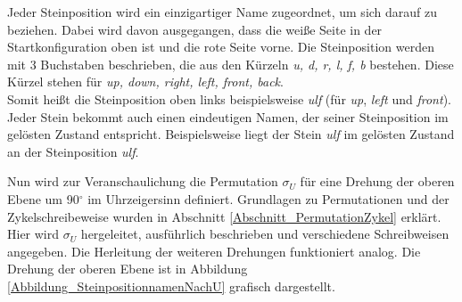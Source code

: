 \documentclass[12pt,a4paper, usenames, dvipsnames]{article}
\theoremstyle{mystyle}
\theoremstyle{definition}
\begin{document}
Jeder Steinposition wird ein einzigartiger Name zugeordnet, um sich darauf zu beziehen. Dabei wird davon ausgegangen, dass die weiße Seite in der Startkonfiguration oben ist und die rote Seite vorne. Die Steinposition werden mit 3 Buchstaben beschrieben, die aus den Kürzeln \textit{u, d, r, l, f, b} bestehen. Diese Kürzel stehen für \textit{up, down, right, left, front, back}. \\
Somit heißt die Steinposition oben links beispielsweise \textit{ulf} (für \textit{up}, \textit{left} und \textit{front}). 
Jeder Stein bekommt auch einen eindeutigen Namen, der seiner Steinposition im gelösten Zustand entspricht. Beispielsweise liegt der Stein \textit{ulf} im gelösten Zustand an der Steinposition \textit{ulf}.

Nun wird zur Veranschaulichung die Permutation $\sigma_U$ für eine Drehung der oberen Ebene um 90$^\circ$ im Uhrzeigersinn definiert. Grundlagen zu Permutationen und der Zykelschreibeweise wurden in Abschnitt \ref{Abschnitt_PermutationZykel} erklärt.
Hier wird $\sigma_U$ hergeleitet, ausführlich beschrieben und verschiedene Schreibweisen angegeben. Die Herleitung der weiteren Drehungen funktioniert analog. 
Die Drehung der oberen Ebene ist in Abbildung \ref{Abbildung_SteinpositionnamenNachU} grafisch dargestellt.
\end{document}
